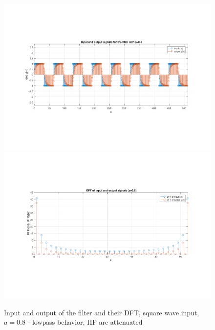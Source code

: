 \begin{figure} [H]
	\centering
	\includegraphics[trim={2.5cm 5cm 2.5cm 5cm}, clip, width=0.75\linewidth]{io_sw_6}
	\includegraphics[trim={2.5cm 5cm 2.5cm 5cm}, clip, width=0.75\linewidth]{dft_sw_6}
	\caption{Input and output of the filter and their DFT, square wave input, $a=0.8$ - lowpass behavior, HF are attenuated}
	\label{fig:t1_io_sw_6}
\end{figure}

